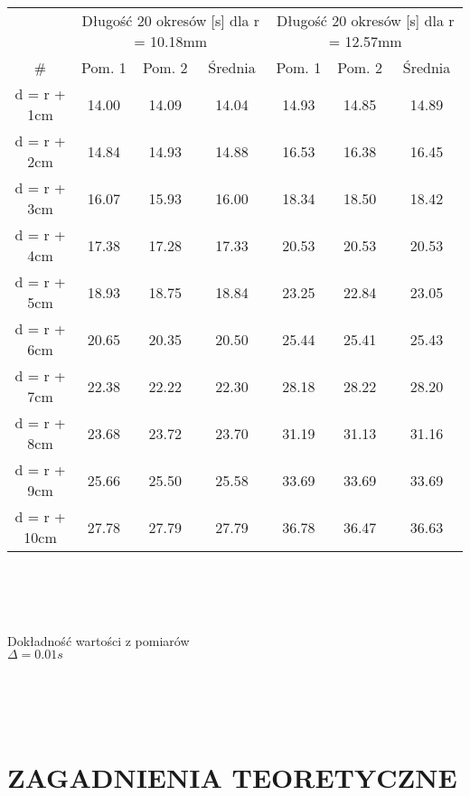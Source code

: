\documentclass{article}
\begin{document}
\begin{tabular}{|c|c|c|c|c|c|c|}
\hline
\multirow{}{}{} & \multicolumn{3}{c|}{Długość 20 okresów [s] dla r = 10.18mm} & \multicolumn{3}{c|}{Długość 20 okresów [s] dla r = 12.57mm} \\ \cline{2-7}
\# & Pom. 1 & Pom. 2 & Średnia & Pom. 1 & Pom. 2 & Średnia \\ \hline
d = r + 1cm & 14.00 & 14.09 & 14.04 & 14.93 & 14.85 & 14.89 \\ \hline
d = r + 2cm & 14.84 & 14.93 & 14.88 & 16.53 & 16.38 & 16.45 \\ \hline
d = r + 3cm & 16.07 & 15.93 & 16.00 & 18.34 & 18.50 & 18.42 \\ \hline
d = r + 4cm & 17.38 & 17.28 & 17.33 & 20.53 & 20.53 & 20.53 \\ \hline
d = r + 5cm & 18.93 & 18.75 & 18.84 & 23.25 & 22.84 & 23.05 \\ \hline
d = r + 6cm & 20.65 & 20.35 & 20.50 & 25.44 & 25.41 & 25.43 \\ \hline
d = r + 7cm & 22.38 & 22.22 & 22.30 & 28.18 & 28.22 & 28.20 \\ \hline
d = r + 8cm & 23.68 & 23.72 & 23.70 & 31.19 & 31.13 & 31.16 \\ \hline
d = r + 9cm & 25.66 & 25.50 & 25.58 & 33.69 & 33.69 & 33.69 \\ \hline
d = r + 10cm & 27.78 & 27.79 & 27.79 & 36.78 & 36.47 & 36.63 \\ \hline
\end{tabular} \\

\textbf{} \\
\textbf{} \\

\raggedright
    {
    {Dokładność wartości z pomiarów} \\
    {$\Delta = 0.01s$} \\
    \textbf{} \\
    }

\textbf{ }\\
\textbf{ }\\


\pagebreak


\centering

\section*{ZAGADNIENIA TEORETYCZNE}
\end{document}
